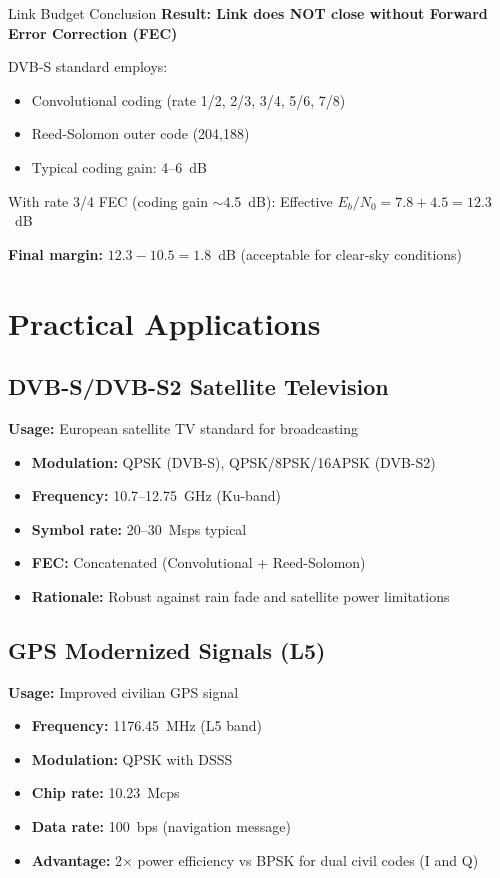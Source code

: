\begin{calloutbox}[colback=black!8!white,colframe=black]{Link Budget Conclusion}
\textbf{Result: Link does NOT close without Forward Error Correction (FEC)}

DVB-S standard employs:
\begin{itemize}
\item Convolutional coding (rate 1/2, 2/3, 3/4, 5/6, 7/8)
\item Reed-Solomon outer code (204,188)
\item Typical coding gain: 4--6~dB
\end{itemize}

With rate 3/4 FEC (coding gain $\sim$4.5~dB): Effective $E_b/N_0 = 7.8 + 4.5 = 12.3$~dB

\textbf{Final margin:} $12.3 - 10.5 = 1.8$~dB (acceptable for clear-sky conditions)
\end{calloutbox}

\section{Practical Applications}

\subsection{DVB-S/DVB-S2 Satellite Television}

\textbf{Usage:} European satellite TV standard for broadcasting
\begin{itemize}
\item \textbf{Modulation:} QPSK (DVB-S), QPSK/8PSK/16APSK (DVB-S2)
\item \textbf{Frequency:} 10.7--12.75~GHz (Ku-band)
\item \textbf{Symbol rate:} 20--30~Msps typical
\item \textbf{FEC:} Concatenated (Convolutional + Reed-Solomon)
\item \textbf{Rationale:} Robust against rain fade and satellite power limitations
\end{itemize}

\subsection{GPS Modernized Signals (L5)}

\textbf{Usage:} Improved civilian GPS signal
\begin{itemize}
\item \textbf{Frequency:} 1176.45~MHz (L5 band)
\item \textbf{Modulation:} QPSK with DSSS
\item \textbf{Chip rate:} 10.23~Mcps
\item \textbf{Data rate:} 100~bps (navigation message)
\item \textbf{Advantage:} 2× power efficiency vs BPSK for dual civil codes (I and Q)
\end{itemize}

